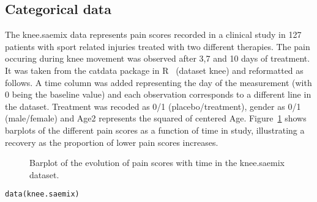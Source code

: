 \clearpage
\newpage

\subsection{Categorical data} \label{sec:kneeCat}

The {\sf knee.saemix} data represents pain scores recorded in a clinical study in 127 patients with sport related injuries treated with two different therapies. The pain occuring during knee movement was observed after 3,7 and 10 days of treatment. It was taken from the {\sf catdata} package in R~\cite{catdata} (dataset {\sf knee}) and reformatted as follows. A time column was added representing the day of the measurement (with 0 being the baseline value) and each observation corresponds to a different line in the dataset. Treatment was recoded as 0/1 (placebo/treatment), gender as 0/1 (male/female) and {\sf Age2} represents the squared of centered Age. Figure~\ref{fig:kneeData} shows barplots of the different pain scores as a function of time in study, illustrating a recovery as the proportion of lower pain scores increases.

\begin{figure}[!h]
\begin{center}
\end{center}
\par \kern -0.5cm
\caption{Barplot of the evolution of pain scores with time in the {\sf knee.saemix} dataset.} \label{fig:kneeData}
\end{figure}

\begin{verbatim}
data(knee.saemix)
\end{verbatim}

